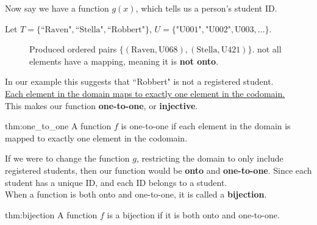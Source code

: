 \noindent
Now say we have a function $g(x)$, which tells us a person's student ID.\\
\begin{center}
    Let $T=\{\text{``Raven"}, \text{``Stella"}, \text{``Robbert"}\}$, $U=\{\text{"U001"}, \text{"U002"}, \text{U003}, ...\}$.
\end{center}

\begin{figure}[ht]
    \centering
    \caption{\centering Produced ordered pairs $\{(\text{Raven},\text{U068}),(\text{Stella},\text{U421})\}$.
        not all elements have a mapping, meaning it is \textbf{not onto}.}
    \label{fig:cats_dogs}
\end{figure}

\noindent
In our example this suggests that ``Robbert" is not a registered student.\\

\noindent
\underline{Each element in the domain maps to exactly one element in the codomain.}\\
This makes our function \textbf{one-to-one}, or \textbf{injective}.\\

\begin{Def}{thm:one_to_one}
    A function $f$ is one-to-one if each element in the domain is mapped to exactly one element in the codomain.
\end{Def}

\noindent
If we were to change the function $g$, restricting the domain to only include
registered students, then our function would be \textbf{onto} and \textbf{one-to-one}. Since
each student has a unique ID, and each ID belongs to a student.\\

\noindent
When a function is both onto and one-to-one, it is called a \textbf{bijection}.\\

\begin{Def}[Bijection]{thm:bijection}
    A function $f$ is a bijection if it is both onto and one-to-one.
\end{Def}

\newpage